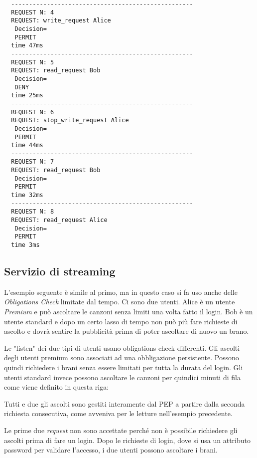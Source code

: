 \begin{verbatim}
  ---------------------------------------------------
  REQUEST N: 4
  REQUEST: write_request Alice
   Decision=
   PERMIT
  time 47ms
  ---------------------------------------------------
  REQUEST N: 5
  REQUEST: read_request Bob
   Decision=
   DENY
  time 25ms
  ---------------------------------------------------
  REQUEST N: 6
  REQUEST: stop_write_request Alice
   Decision=
   PERMIT
  time 44ms
  ---------------------------------------------------
  REQUEST N: 7
  REQUEST: read_request Bob
   Decision=
   PERMIT
  time 32ms
  ---------------------------------------------------
  REQUEST N: 8
  REQUEST: read_request Alice
   Decision=
   PERMIT
  time 3ms
\end{verbatim}
\subsection{Servizio di streaming}
\label{sub:Stream_Code_Sec}
L'esempio seguente è simile al primo, ma in questo caso si fa uso anche delle \emph{Obligations Check} limitate dal tempo.
Ci sono due utenti. Alice è un utente \emph{Premium} e può ascoltare le canzoni senza limiti una volta fatto il login. Bob
è un utente standard e dopo un certo lasso di tempo non può più fare richieste di ascolto e dovrà sentire la pubblicità prima
di poter ascoltare di nuovo un brano.

Le "listen" dei due tipi di utenti usano obligations check differenti. Gli ascolti degli utenti premium sono associati
ad una obbligazione persistente. Possono quindi richiedere i brani senza essere limitati per tutta la durata del login.
Gli utenti standard invece possono ascoltare le canzoni per quindici minuti di fila come viene definito in questa riga:

Tutti e due gli ascolti sono gestiti interamente dal \ac{PEP} a partire dalla seconda richiesta consecutiva, come avveniva per
le letture nell'esempio precedente.

Le prime due \emph{request} non sono accettate perché non è possibile richiedere gli ascolti prima di fare un login.
Dopo le richieste di login, dove si usa un attributo password per validare l'accesso, i due utenti possono ascoltare i brani.

